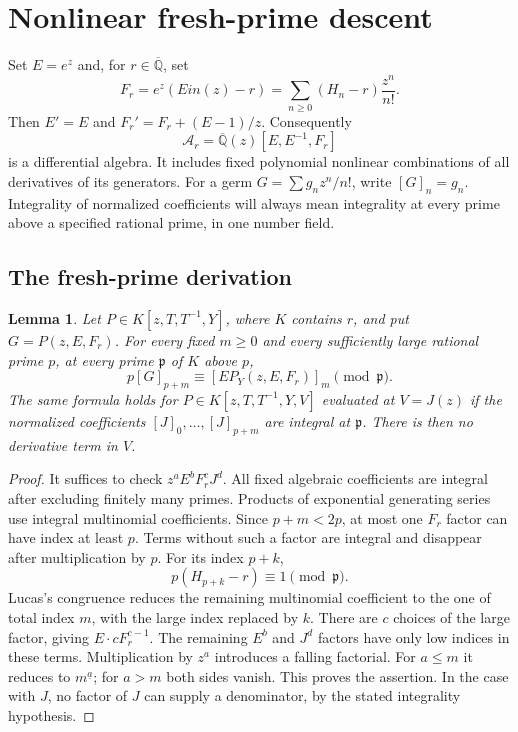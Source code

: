 \documentclass[11pt,a4paper]{article}
\newtheorem{lemma}[theorem]{Lemma}
\theoremstyle{definition}
\theoremstyle{remark}
\theoremstyle{plain}
\numberwithin{equation}{section}
\def\operatorname#1{#1}\def\mathrm#1{#1}}
\begin{document}
\section{Nonlinear fresh-prime descent}
\label{sc:sec:nonlinear-imports}

Set $E=e^z$ and, for $r\in\overline{\mathbb Q}$, set
\[
 F_r=e^z(\operatorname{Ein}(z)-r)
     =\sum_{n\ge0}(H_n-r)\frac{z^n}{n!}.
\]
Then $E'=E$ and $F_r'=F_r+(E-1)/z$. Consequently
\[
 \mathcal A_r=\overline{\mathbb Q}(z)[E,E^{-1},F_r]
\]
is a differential algebra. It includes fixed polynomial nonlinear
combinations of all derivatives of its generators.
For a germ $G=\sum g_nz^n/n!$, write $[G]_n=g_n$.
Integrality of normalized coefficients will always mean integrality
at every prime above a specified rational prime, in one number field.

\subsection{The fresh-prime derivation}

\begin{lemma}\label{sc:nl:fresh}
Let $P\in K[z,T,T^{-1},Y]$, where $K$ contains $r$, and put
$G=P(z,E,F_r)$. For every fixed $m\ge0$ and every sufficiently large
rational prime $p$, at every prime $\mathfrak p$ of $K$ above $p$,
\[
 p[G]_{p+m}\equiv[E P_Y(z,E,F_r)]_m\pmod{\mathfrak p}.
\]
The same formula holds for
$P\in K[z,T,T^{-1},Y,V]$ evaluated at $V=J(z)$ if the normalized
coefficients $[J]_0,\ldots,[J]_{p+m}$ are integral at $\mathfrak p$.
There is then no derivative term in $V$.
\end{lemma}
\begin{proof}
It suffices to check $z^aE^bF_r^cJ^d$. All fixed algebraic
coefficients are integral after excluding finitely many primes.
Products of exponential generating series use integral multinomial
coefficients. Since $p+m<2p$, at most one $F_r$ factor can have
index at least $p$. Terms without such a factor are integral and
disappear after multiplication by $p$. For its index $p+k$,
\[
 p(H_{p+k}-r)\equiv1\pmod{\mathfrak p}.
\]
Lucas's congruence reduces the remaining multinomial coefficient to
the one of total index $m$, with the large index replaced by $k$.
There are $c$ choices of the large factor, giving $E\cdot cF_r^{c-1}$.
The remaining $E^b$ and $J^d$ factors have only low indices in these
terms. Multiplication by $z^a$ introduces a falling factorial. For
$a\le m$ it reduces to $m^{\underline a}$; for $a>m$ both sides vanish.
This proves the assertion. In the case with $J$, no factor of $J$
can supply a denominator, by the stated integrality hypothesis.
\end{proof}
\end{document}
